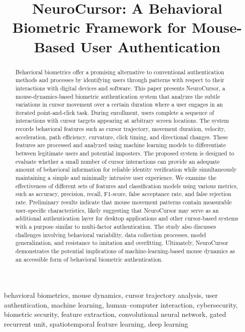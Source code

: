 \documentclass[conference]{IEEEtran}
\title{NeuroCursor: A Behavioral Biometric Framework for Mouse-Based User Authentication}
\author{
\IEEEauthorblockN{
Shaurya Saxena,
Chetan Gangireddy,
Shreehan Aalok Pathak,
Hamid Abdul Mossa
}
\IEEEauthorblockA{
Department of Computer Science\\
The University of Texas at Dallas, Richardson, Texas, United States\\
}
}
\begin{document}
\maketitle

\begin{abstract}
Behavioral biometrics offer a promising alternative to conventional authentication methods and processes by identifying users through patterns with respect to their interactions with digital devices and software. This paper presents NeuroCursor, a mouse-dynamics-based biometric authentication system that analyzes the subtle variations in cursor movement over a certain duration where a user engages in an iterated point-and-click task. During enrollment, users complete a sequence of interactions with cursor targets appearing at arbitrary screen locations. The system records behavioral features such as cursor trajectory, movement duration, velocity, acceleration, path efficiency, curvature, click timing, and directional changes. These features are processed and analyzed using machine learning models to differentiate between legitimate users and potential imposters. The proposed system is designed to evaluate whether a small number of cursor interactions can provide an adequate amount of behavioral information for reliable identity verification while simultaneously maintaining a simple and minimally intrusive user experience. We examine the effectiveness of different sets of features and classification models using various metrics, such as accuracy, precision, recall, F1-score, false acceptance rate, and false rejection rate. Preliminary results indicate that mouse movement patterns contain measurable user-specific characteristics, likely suggesting that NeuroCursor may serve as an additional authentication layer for desktop applications and other cursor-based systems with a purpose similar to multi-factor authentication. The study also discusses challenges involving behavioral variability, data collection processes, model generalization, and resistance to imitation and overfitting. Ultimately, NeuroCursor demonstrates the potential implications of machine-learning-based mouse dynamics as an accessible form of behavioral biometric authentication. 
\end{abstract}

\begin{IEEEkeywords}
behavioral biometrics, mouse dynamics, cursor trajectory analysis, user authentication, machine learning, human--computer interaction, cybersecurity, biometric security, feature extraction, convolutional neural network, gated recurrent unit, spatiotemporal feature learning, deep learning 
\end{IEEEkeywords}
\end{document}
